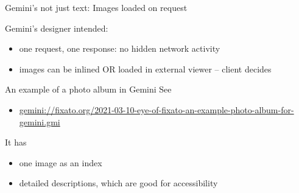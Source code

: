\documentclass[presentation, 11pt,  aspectratio=169]{beamer}
\begin{document}
\begin{frame}[label={sec:org5ad0657}]{Gemini's not just text:  Images loaded on request}
\begin{block}{Gemini's designer intended:}
\begin{itemize}
\item one request, one response: no hidden network activity\\
\item images can be inlined OR loaded in external viewer -- \alert{client decides}\\
\end{itemize}

\pause
\end{block}
\begin{block}{An example of a photo album in Gemini}
See\\
\begin{small}
\begin{itemize}
\item \href{gemini://fixato.org/2021-03-10-eye-of-fixato-an-example-photo-album-for-gemini.gmi}{gemini://fixato.org/2021-03-10-eye-of-fixato-an-example-photo-album-for-gemini.gmi}\\
\end{itemize}
\end{small}
It has\\
\begin{itemize}
\item one image as an index\\
\item detailed descriptions, which are good for accessibility\\
\end{itemize}
\end{block}
\end{frame}
\end{document}
